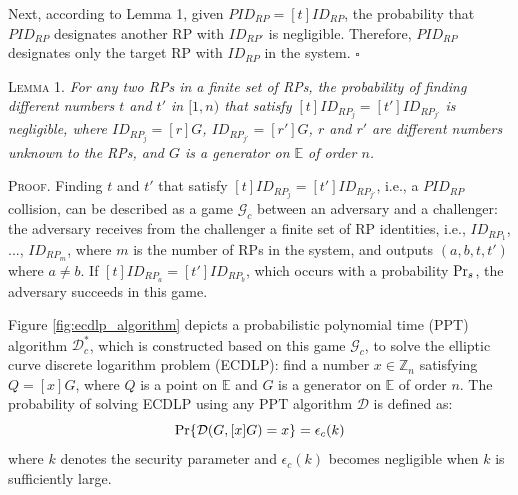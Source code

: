 Next, according to Lemma 1, given $PID_{RP} = [t]ID_{RP}$, the probability that $PID_{RP}$ designates another RP with $ID_{RP'}$ is negligible. %
Therefore, $PID_{RP}$ designates only the target RP with $ID_{RP}$ in the system.  \hfill $\square$

\vspace{3mm}
\noindent\textsc{Lemma 1.} {\em  For any two RPs in a finite set of RPs, the probability of finding different numbers $t$ and $t'$ in $[1,n)$ that satisfy $[t]ID_{RP_j} = [t']ID_{RP_{j'}}$ is negligible, where $ID_{RP_j}=[r]G$, $ID_{RP_{j'}}=[r']G$, $r$ and $r'$ are different numbers unknown to the RPs, and $G$ is a generator on $\mathbb{E}$ of order $n$.}


\oldc
\vspace{0.75mm}
\noindent\textsc{Proof.}
Finding $t$ and $t'$ that satisfy $[t]ID_{RP_j} = [t']ID_{RP_{j'}}$, i.e., a $PID_{RP}$ collision, can be described as a game $\mathcal{G}_c$ between an adversary and a challenger: the adversary receives from the challenger a finite set of RP identities, i.e., $ID_{RP_1}$, ..., $ID_{RP_m}$, where $m$ is the number of RPs in the system, and outputs $(a, b, t, t')$ where $a \neq b$. If $[t]ID_{RP_a}=[t']ID_{RP_b}$, which occurs with a probability ${\rm Pr}_s$, the adversary succeeds in this game.

Figure \ref{fig:ecdlp_algorithm} depicts a probabilistic polynomial time (PPT) algorithm $\mathcal{D}^*_c$, which is constructed based on this game $\mathcal{G}_c$, to solve the elliptic curve discrete logarithm problem (ECDLP): find a number $x \in \mathbb{Z}_n$ satisfying $Q = [x]G$, where $Q$ is a point on $\mathbb{E}$ and $G$ is a generator on $\mathbb{E}$ of order $n$.
The probability of solving ECDLP using any PPT algorithm $\mathcal{D}$ is defined as:
\begin{equation*}
{\rm Pr}\{\mathcal{D}(G, [x]G)=x\} = \epsilon_{c}(k)
\end{equation*}
where $k$ denotes the security parameter and $\epsilon_{c}(k)$ becomes negligible when $k$ is sufficiently large.


